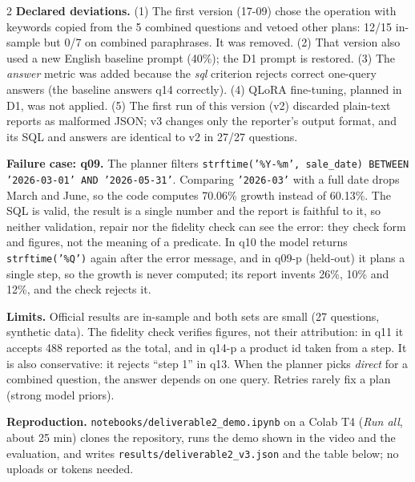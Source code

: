 \documentclass[10pt]{article}
\newcommand{\head}[1]{\textbf{\color{ucblue}#1}\hspace{0.4em}}
\begin{document}
\begin{multicols}{2}
\head{Declared deviations.} (1) The first version (17-09) chose the operation with keywords
copied from the 5 combined questions and vetoed other plans: 12/15 in-sample but 0/7 on
combined paraphrases. It was removed. (2) That version also used a new English baseline prompt
(40\%); the D1 prompt is restored. (3) The \textit{answer} metric was added because the
\textit{sql} criterion rejects correct one-query answers (the baseline answers q14 correctly).
(4) QLoRA fine-tuning, planned in D1, was not applied. (5) The first run of this version (v2)
discarded plain-text reports as malformed JSON; v3 changes only the reporter's output format,
and its SQL and answers are identical to v2 in 27/27 questions.

\head{Failure case: q09.} The planner filters \texttt{strftime('\%Y-\%m', sale\_date) BETWEEN
'2026-03-01' AND '2026-05-31'}. Comparing \texttt{'2026-03'} with a full date drops March and
June, so the code computes 70.06\% growth instead of 60.13\%. The SQL is valid, the result is
a single number and the report is faithful to it, so neither validation, repair nor the
fidelity check can see the error: they check form and figures, not the meaning of a predicate.
In q10 the model returns \texttt{strftime('\%Q')} again after the error message, and in q09-p
(held-out) it plans a single step, so the growth is never computed; its report invents 26\%,
10\% and 12\%, and the check rejects it.

\head{Limits.} Official results are in-sample and both sets are small (27 questions, synthetic
data). The fidelity check verifies figures, not their attribution: in q11 it accepts 488
reported as the total, and in q14-p a product id taken from a step. It is also conservative:
it rejects ``step 1'' in q13. When the planner picks \textit{direct} for a combined question,
the answer depends on one query. Retries rarely fix a plan (strong model priors).

\head{Reproduction.} \texttt{notebooks/deliverable2\_demo.ipynb} on a Colab T4 (\textit{Run all},
about 25 min) clones the repository, runs the demo shown in the video and the evaluation, and
writes \texttt{results/deliverable2\_v3.json} and the table below; no uploads or tokens needed.
\end{multicols}

\vspace{-4pt}
\begin{center}
\footnotesize

\end{center}
\end{document}
